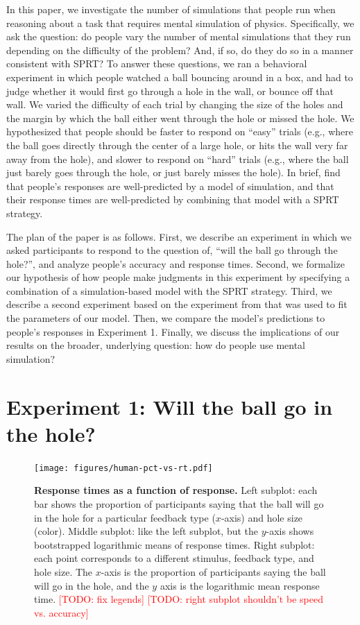 \documentclass[10pt,letterpaper]{article}
\newcommand{\TODO}[1]{\textcolor{red}{[TODO: #1]}}
\begin{document}
In this paper, we investigate the number of simulations that people run when reasoning about a task that requires mental simulation of physics. Specifically, we ask the question: do people vary the number of mental simulations that they run depending on the difficulty of the problem? And, if so, do they do so in a manner consistent with SPRT? To answer these questions, we ran a behavioral experiment in which people watched a ball bouncing around in a box, and had to judge whether it would first go through a hole in the wall, or bounce off that wall. We varied the difficulty of each trial by changing the size of the holes and the margin by which the ball either went through the hole or missed the hole. We hypothesized that people should be faster to respond on ``easy'' trials (e.g., where the ball goes directly through the center of a large hole, or hits the wall very far away from the hole), and slower to respond on ``hard'' trials (e.g., where the ball just barely goes through the hole, or just barely misses the hole). In brief, find that people's responses are well-predicted by a model of simulation, and that their response times are well-predicted by combining that model with a SPRT strategy.

The plan of the paper is as follows. First, we describe an experiment in which we asked participants to respond to the question of, ``will the ball go through the hole?'', and analyze people's accuracy and response times. Second, we formalize our hypothesis of how people make judgments in this experiment by specifying a combination of a simulation-based model with the SPRT strategy. Third, we describe a second experiment based on the experiment from  that was used to fit the parameters of our model. Then, we compare the model's predictions to people's responses in Experiment 1. Finally, we discuss the implications of our results on the broader, underlying question: how do people use mental simulation?

\section{Experiment 1: Will the ball go in the hole?}

\begin{figure}[t]
    \begin{center}
        \texttt{[image: figures/human-pct-vs-rt.pdf]}
        \caption{\textbf{Response times as a function of response.} Left subplot: each bar shows the proportion of participants saying that the ball will go in the hole for a particular feedback type ($x$-axis) and hole size (color). Middle subplot: like the left subplot, but the $y$-axis shows bootstrapped logarithmic means of response times. Right subplot: each point corresponds to a different stimulus, feedback type, and hole size.  The $x$-axis is the proportion of participants saying the ball will go in the hole, and the $y$ axis is the logarithmic mean response time. \TODO{fix legends} \TODO{right subplot shouldn't be speed vs. accuracy}}
        \label{fig:pct-vs-rt}
    \end{center}
\end{figure}
\end{document}
